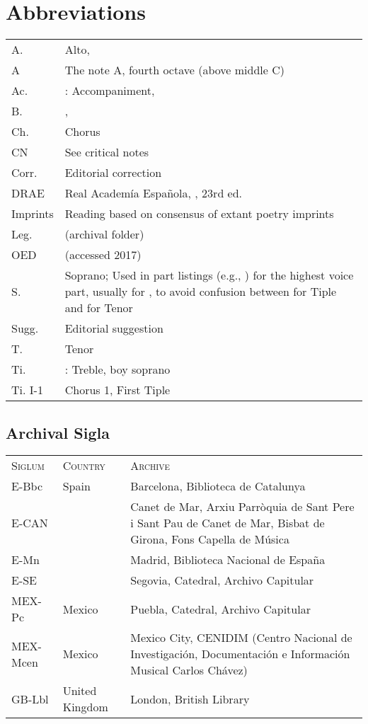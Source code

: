\section{Abbreviations}

\begin{tabu} to \textwidth{lZ}
    A. & Alto, \\
    A & The note A, fourth octave (above middle C) \\
    Ac. & : Accompaniment, \\
    B. & , \\
    Ch. & Chorus\\
    CN & See critical notes\\
    Corr. & Editorial correction\\
    DRAE & Real Academía Española, , 
    23rd ed.\\
    Imprints & Reading based on consensus of extant poetry imprints\\
    Leg. &  (archival folder)\\
    OED &  (accessed 2017)\\
    S. & Soprano; Used in part listings (e.g., ) for the highest voice 
    part, usually for , to avoid confusion between  for 
    Tiple and  for Tenor\\
    Sugg. & Editorial suggestion\\
    T. & Tenor\\
    Ti. & : Treble, boy soprano\\
    Ti. I-1 & Chorus 1, First Tiple\\
\end{tabu}

\subsection{Archival Sigla}

\begin{tabu} to \textwidth{llZ}
    \textsc{Siglum} & \textsc{Country} & \textsc{Archive}\\
    E-Bbc & Spain & Barcelona, Biblioteca de Catalunya\\
    E-CAN &  & Canet de Mar, Arxiu Parròquia de Sant Pere i Sant Pau de Canet de 
    Mar, Bisbat de Girona, Fons Capella de Música\\
    E-Mn & &  Madrid, Biblioteca Nacional de España\\
    E-SE & & Segovia, Catedral, Archivo Capitular\\
    MEX-Pc & Mexico &  Puebla, Catedral, Archivo Capitular\\
    MEX-Mcen & Mexico & Mexico City, CENIDIM (Centro Nacional de Investigación, 
    Documentación e Información Musical Carlos Chávez)\\
    GB-Lbl & United Kingdom & London, British Library\\
\end{tabu}




